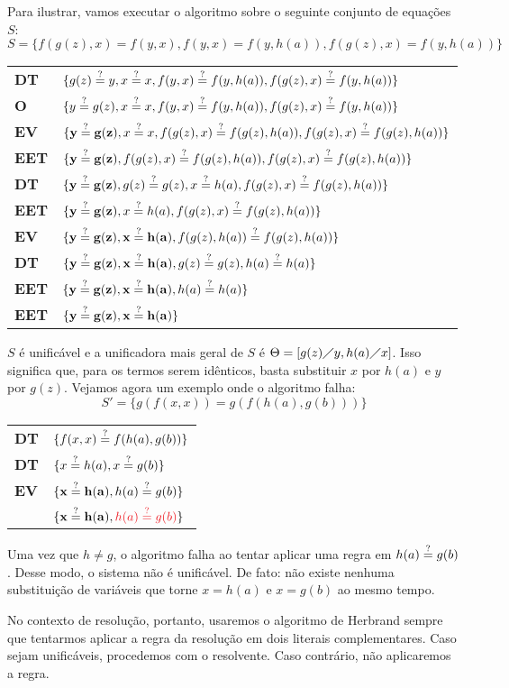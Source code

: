 Para ilustrar, vamos executar o algoritmo sobre o seguinte conjunto de equações $S$:
\[S = \{f(g(z), x) = f(y, x), f(y,x) = f(y,h(a)), f(g(z), x) = f(y, h(a))\}\]
\begin{center}
    \begin{tabular}{l l}
        \textbf{DT} & $\{g(z) \overset{?}{=} y, x \overset{?}{=} x, f(y,x) \overset{?}{=} f(y,h(a)), f(g(z), x) \overset{?}{=} f(y, h(a))\}$ \\
        \textbf{O} & $\{y \overset{?}{=} g(z), x \overset{?}{=} x, f(y,x) \overset{?}{=} f(y,h(a)), f(g(z), x) \overset{?}{=} f(y, h(a))\}$ \\
        \textbf{EV} & $\{\mathbf{y \overset{?}{=} g(z)}, x \overset{?}{=} x, f(g(z),x) \overset{?}{=} f(g(z),h(a)), f(g(z), x) \overset{?}{=} f(g(z), h(a))\}$ \\
        \textbf{EET} & $\{\mathbf{y \overset{?}{=} g(z)}, f(g(z),x) \overset{?}{=} f(g(z),h(a)), f(g(z), x) \overset{?}{=} f(g(z), h(a))\}$ \\
        \textbf{DT} & $\{\mathbf{y \overset{?}{=} g(z)}, g(z) \overset{?}{=} g(z), x \overset{?}{=} h(a), f(g(z), x) \overset{?}{=} f(g(z), h(a))\}$ \\
        \textbf{EET} & $\{\mathbf{y \overset{?}{=} g(z)}, x \overset{?}{=} h(a), f(g(z), x) \overset{?}{=} f(g(z), h(a))\}$ \\
        \textbf{EV} & $\{\mathbf{y \overset{?}{=} g(z)}, \mathbf{x \overset{?}{=} h(a)}, f(g(z), h(a)) \overset{?}{=} f(g(z), h(a))\}$ \\
        \textbf{DT} & $\{\mathbf{y \overset{?}{=} g(z)}, \mathbf{x \overset{?}{=} h(a)}, g(z) \overset{?}{=} g(z), h(a) \overset{?}{=} h(a)\}$ \\
        \textbf{EET} & $\{\mathbf{y \overset{?}{=} g(z)}, \mathbf{x \overset{?}{=} h(a)}, h(a) \overset{?}{=} h(a)\}$ \\
        \textbf{EET} & $\{\mathbf{y \overset{?}{=} g(z)}, \mathbf{x \overset{?}{=} h(a)}\}$ 
    \end{tabular}
\end{center}
$S$ é unificável e a unificadora mais geral de $S$ é $\Theta = [g(z)\diagup y, h(a) \diagup x]$. Isso significa que, para os termos serem idênticos, basta substituir $x$ por $h(a)$ e $y$ por $g(z)$. Vejamos agora um exemplo onde o algoritmo falha:
\[S' = \{g(f(x,x)) = g(f(h(a), g(b)))\}\]
\begin{center}
    \begin{tabular}{l l}
        \textbf{DT} & $\{f(x,x) \overset{?}{=} f(h(a), g(b))\}$ \\
        \textbf{DT} & $\{x \overset{?}{=} h(a), x \overset{?}{=} g(b)\}$ \\
        \textbf{EV} & $\{\mathbf{x \overset{?}{=} h(a)}, h(a) \overset{?}{=} g(b)\}$ \\
        & $\{\mathbf{x \? h(a)}, {\color{Red}h(a) \? g(b)}\}$
    \end{tabular}
\end{center}

Uma vez que $h \neq g$, o algoritmo falha ao tentar aplicar uma regra em $h(a) \overset{?}{=} g(b)$. Desse modo, o sistema não é unificável. De fato: não existe nenhuma substituição de variáveis que torne $x = h(a)$ e $x = g(b)$ ao mesmo tempo. 

No contexto de resolução, portanto, usaremos o algoritmo de Herbrand sempre que tentarmos aplicar a regra da resolução em dois literais complementares. Caso sejam unificáveis, procedemos com o resolvente. Caso contrário, não aplicaremos a regra.